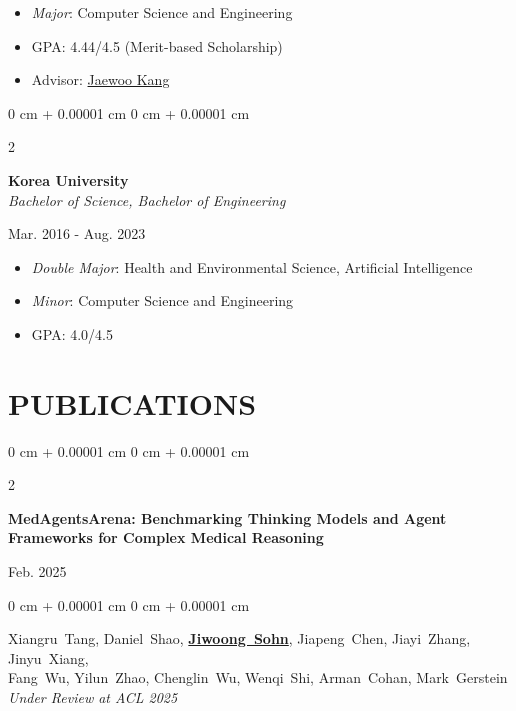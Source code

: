 \documentclass[10pt, letterpaper]{article}
\newenvironment{highlights}{
    \begin{itemize}[
        topsep=0.10 cm,
        parsep=0.10 cm,
        partopsep=0pt,
        itemsep=0pt,
        leftmargin=0 cm + 10pt
    ]
}{
    \end{itemize}
} %
\newenvironment{onecolentry}{
    \begin{adjustwidth}{
        0 cm + 0.00001 cm
    }{
        0 cm + 0.00001 cm
    }
}{
    \end{adjustwidth}
} %
\newenvironment{twocolentry}[2][]{
    \onecolentry
    \def\secondColumn{#2}
    \setcolumnwidth{\fill, 3.5 cm}
    \begin{paracol}{2}
}{
    \switchcolumn \raggedleft \secondColumn
    \end{paracol}
    \endonecolentry
} %
\begin{document}
        \begin{highlights}
            
            \item \textit{Major}: Computer Science and Engineering
            \\
            \item GPA: 4.44/4.5 (Merit-based Scholarship)
            \\
            \item Advisor: \href{https://scholar.google.co.kr/citations?user=RaBZafQAAAAJ&hl=ko}{Jaewoo Kang}
             \\
        \end{highlights}
        \vspace{0.2 cm}

        \begin{twocolentry}{
            Mar. 2016 - Aug. 2023
        }
            \textbf{Korea University}\\\textit{Bachelor of Science, Bachelor of Engineering}
        \end{twocolentry}

        \begin{highlights}
            
            \item \textit{Double Major}: Health and Environmental Science, Artificial Intelligence
             \\
            \item \textit{Minor}: Computer Science and Engineering
            \item GPA: 4.0/4.5
             \\
        \end{highlights}
    \vspace{0.2 cm}

\section{PUBLICATIONS}
\vspace{0.2 cm}
       \begin{twocolentry}
            {
                Feb. 2025
            }
            {
                \textbf{MedAgentsArena: Benchmarking Thinking Models and Agent Frameworks for Complex Medical Reasoning}
            }
        \end{twocolentry}           
        \begin{onecolentry} 
                \mbox{Xiangru Tang}, \mbox{Daniel Shao}, \mbox{\textbf{\underline{Jiwoong Sohn}}}, \mbox{Jiapeng Chen}, \mbox{Jiayi Zhang}, \mbox{Jinyu Xiang}, \\
                \mbox{Fang Wu}, \mbox{Yilun Zhao}, \mbox{Chenglin Wu}, \mbox{Wenqi Shi}, \mbox{Arman Cohan}, \mbox{Mark Gerstein} \\
                \textit{Under Review at ACL 2025}
        \end{onecolentry}
    \vspace{0.3 cm}
\end{document}
